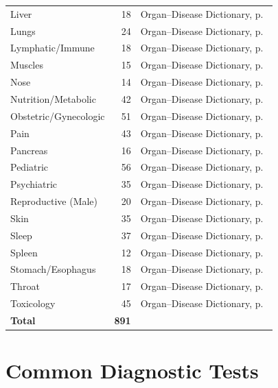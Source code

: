 \begin{tabularx}{\textwidth}{lrc}
Liver                & 18  & Organ--Disease Dictionary, p.~\pageref{sec:organ_liver} \\
Lungs                & 24  & Organ--Disease Dictionary, p.~\pageref{sec:organ_lungs} \\
Lymphatic/Immune     & 18  & Organ--Disease Dictionary, p.~\pageref{sec:organ_lymph} \\
Muscles              & 15  & Organ--Disease Dictionary, p.~\pageref{sec:organ_muscles} \\
Nose                 & 14  & Organ--Disease Dictionary, p.~\pageref{sec:organ_nose} \\
Nutrition/Metabolic  & 42  & Organ--Disease Dictionary, p.~\pageref{sec:organ_nutrition} \\
Obstetric/Gynecologic& 51  & Organ--Disease Dictionary, p.~\pageref{sec:organ_obstetric} \\
Pain                 & 43  & Organ--Disease Dictionary, p.~\pageref{sec:organ_pain} \\
Pancreas             & 16  & Organ--Disease Dictionary, p.~\pageref{sec:organ_pancreas} \\
Pediatric            & 56  & Organ--Disease Dictionary, p.~\pageref{sec:organ_pediatric} \\
Psychiatric          & 35  & Organ--Disease Dictionary, p.~\pageref{sec:organ_psychiatric} \\
Reproductive (Male)  & 20  & Organ--Disease Dictionary, p.~\pageref{sec:organ_reproductive} \\
Skin                 & 35  & Organ--Disease Dictionary, p.~\pageref{sec:organ_skin} \\
Sleep                & 37  & Organ--Disease Dictionary, p.~\pageref{sec:organ_sleep} \\
Spleen               & 12  & Organ--Disease Dictionary, p.~\pageref{sec:organ_spleen} \\
Stomach/Esophagus    & 18  & Organ--Disease Dictionary, p.~\pageref{sec:organ_stomach} \\
Throat               & 17  & Organ--Disease Dictionary, p.~\pageref{sec:organ_throat} \\
Toxicology           & 45  & Organ--Disease Dictionary, p.~\pageref{sec:organ_toxicology} \\
\midrule
\textbf{Total}       & \textbf{891} & \\
\bottomrule
\end{tabularx}

\section*{Common Diagnostic Tests}
\label{sec:quickref_tests}

